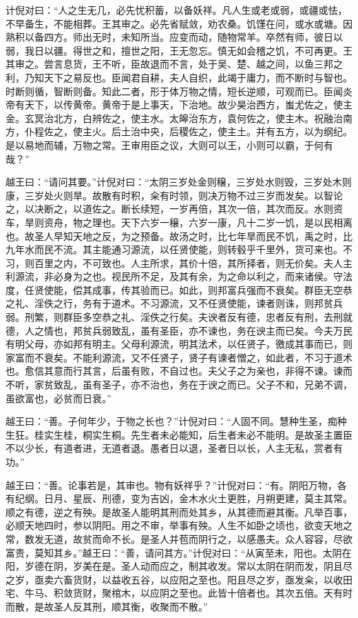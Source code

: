 \documentclass[12pt,UTF8]{ctexbook}
\begin{document}
计倪对曰：“人之生无几，必先忧积蓄，以备妖祥。凡人生或老或弱，或疆或怯，不早备生，不能相葬。王其审之。必先省赋敛，劝农桑。饥馑在问，或水或塘。因熟积以备四方。师出无时，未知所当。应变而动，随物常羊。卒然有师，彼日以弱，我日以疆。得世之和，擅世之阳，王无忽忘。慎无如会稽之饥，不可再更。王其审之。尝言息货，王不听，臣故退而不言，处于吴、楚、越之间，以鱼三邦之利，乃知天下之易反也。臣闻君自耕，夫人自织，此竭于庸力，而不断时与智也。时断则循，智断则备。知此二者，形于体万物之情，短长逆顺，可观而已。臣闻炎帝有天下，以传黄帝。黄帝于是上事天，下治地。故少昊治西方，蚩尤佐之，使主金。玄冥治北方，白辨佐之，使主水。太皞治东方，袁何佐之，使主木。祝融治南方，仆程佐之，使主火。后土治中央，后稷佐之，使主土。并有五方，以为纲纪。是以易地而辅，万物之常。王审用臣之议，大则可以王，小则可以霸，于何有哉？”

越王曰：“请问其要。”计倪对曰：“太阴三岁处金则穣，三岁处水则毁，三岁处木则康，三岁处火则旱。故散有时积，籴有时领，则决万物不过三岁而发矣。以智论之，以决断之，以道佐之。断长续短，一岁再倍，其次一倍，其次而反。水则资车，旱则资舟，物之理也。天下六岁一穣，六岁一康，凡十二岁一饥，是以民相离也。故圣人早知天地之反，为之预备。故汤之时，比七年旱而民不饥，禹之时，比九年水而民不流。其主能通习源流，以任贤使能，则转毂乎千里外，货可来也。不习，则百里之内，不可致也。人主所求，其价十倍，其所择者，则无价矣。夫人主利源流，非必身为之也。视民所不足，及其有余，为之命以利之，而来诸侯。守法度，任贤使能，偿其成事，传其验而已。如此，则邦富兵强而不衰矣。群臣无空恭之礼、淫佚之行，务有于道术。不习源流，又不任贤使能，谏者则诛，则邦贫兵弱。刑繁，则群臣多空恭之礼、淫佚之行矣。夫谀者反有德，忠者反有刑，去刑就德，人之情也，邦贫兵弱致乱，虽有圣臣，亦不谏也，务在谀主而已矣。今夫万民有明父母，亦如邦有明主。父母利源流，明其法术，以任贤子，徼成其事而已，则家富而不衰矣。不能利源流，又不任贤子，贤子有谏者憎之，如此者，不习于道术也。愈信其意而行其言，后虽有败，不自过也。夫父子之为亲也，非得不谏。谏而不听，家贫致乱，虽有圣子，亦不治也，务在于谀之而已。父子不和，兄弟不调，虽欲富也，必贫而日衰。”

越王曰：“善。子何年少，于物之长也？”计倪对曰：“人固不同。慧种生圣，痴种生狂。桂实生桂，桐实生桐。先生者未必能知，后生者未必不能明。是故圣主置臣不以少长，有道者进，无道者退。愚者日以退，圣者日以长，人主无私，赏者有功。”

越王曰：“善。论事若是，其审也。物有妖祥乎？”计倪对曰：“有。阴阳万物，各有纪纲。日月、星辰、刑德，变为吉凶，金木水火土更胜，月朔更建，莫主其常。顺之有德，逆之有殃。是故圣人能明其刑而处其乡，从其德而避其衡。凡举百事，必顺天地四时，参以阴阳。用之不审，举事有殃。人生不如卧之顷也，欲变天地之常，数发无道，故贫而命不长。是圣人并苞而阴行之，以感愚夫。众人容容，尽欲富贵，莫知其乡。”越王曰：“善，请问其方。”计倪对曰：“从寅至未，阳也。太阴在阳，岁德在阴，岁美在是。圣人动而应之，制其收发。常以太阴在阴而发，阴且尽之岁，亟卖六畜货财，以益收五谷，以应阳之至也。阳且尽之岁，亟发籴，以收田宅、牛马、积敛货财，聚棺木，以应阴之至也。此皆十倍者也。其次五倍。天有时而散，是故圣人反其刑，顺其衡，收聚而不散。”
\end{document}
